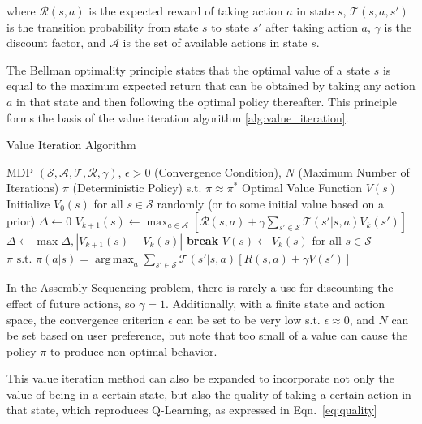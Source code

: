 \documentclass{article}
\DeclareMathOperator*{\argmax}{arg\,max}
\begin{document}
where $\mathcal{R}(s,a)$ is the expected reward of taking action $a$ in state $s$, $\mathcal{T}(s,a,s')$ is the transition probability from state $s$ to state $s'$ after taking action $a$, $\gamma$ is the discount factor, and $\mathcal{A}$ is the set of available actions in state $s$.

The Bellman optimality principle states that the optimal value of a state $s$ is equal to the maximum expected return that can be obtained by taking any action $a$ in that state and then following the optimal policy thereafter. This principle forms the basis of the value iteration algorithm \ref{alg:value_iteration}.
\begin{algorithm}[H]
    \caption{Value Iteration Algorithm}
    \label{alg:value_iteration}
    \begin{algorithmic}[1]
        \Require MDP $(\mathcal{S}, \mathcal{A}, \mathcal{T}, \mathcal{R}, \gamma)$, 
        \Require $\epsilon > 0$  (Convergence Condition), $N$ (Maximum Number of Iterations)
        \Ensure $\pi$ (Deterministic Policy) s.t. $\pi \approx \pi^*$
        \Ensure Optimal Value Function $V(s)$
        \State Initialize $V_0(s)$ for all $s \in \mathcal{S}$ randomly (or to some initial value based on a prior)
        \State $\Delta \gets 0$
        \State $V_{k+1}(s) \gets \max_{a \in \mathcal{A}} \left [ \mathcal{R}(s,a) + \gamma \sum_{s' \in \mathcal{S}} \mathcal{T}(s' | s,a) V_k(s') \right ]$
        \State $\Delta \gets \max {\Delta, |V_{k+1}(s) - V_k(s)|}$
        \EndFor
        \If{$\Delta < \epsilon$}
        \State \textbf{break}
        \EndIf
        \EndFor
        \State $V(s) \gets V_k(s)$ for all $s \in \mathcal{S}$
        \State \Return $\pi \text { s.t. } \pi(a|s)=\argmax_{a} \sum_{s'\in\mathcal{S}} \mathcal{T}(s'|s,a)\left[R(s,a)+\gamma V(s')\right]$
    \end{algorithmic}
\end{algorithm}

In the Assembly Sequencing problem, there is rarely a use for discounting the effect of future actions, so $\gamma = 1$. Additionally, with a finite state and action space, the convergence criterion $\epsilon$ can be set to be very low s.t. $\epsilon \approx 0$, and $N$ can be set based on user preference, but note that too small of a value can cause the policy $\pi$ to produce non-optimal behavior.

This value iteration method can also be expanded to incorporate not only the value of being in a certain state, but also the quality of taking a certain action in that state, which reproduces Q-Learning, as expressed in Eqn.~\ref{eq:quality}
\end{document}
